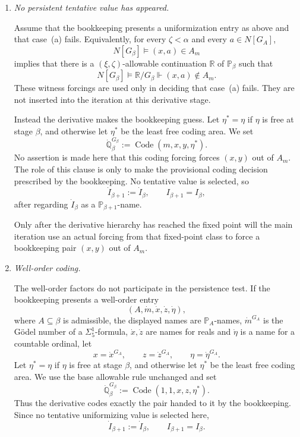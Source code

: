 \documentclass[a4paper,11pt]{article}
\newcommand{\forceP}{\mathbb{P}}
\newcommand{\forceQ}{\mathbb{Q}}
\newcommand{\forceR}{\mathbb{R}}
\begin{document}
\begin{enumerate}
\item[(b)] \emph{No persistent tentative value has appeared.}

Assume that the bookkeeping presents a uniformization entry as above and that case~(a) fails. Equivalently, for every $\zeta<\alpha$ and every $a\in N[G_A]$,
\[
N[G_\beta]\models (x,a)\in A_m
\]
implies that there is a $(\xi,\zeta)$-allowable continuation $\forceR$ of $\forceP_\beta$ such that
\[
N[G_\beta]\models
\forceR/G_\beta\Vdash (x,a)\notin A_m.
\]
These witness forcings are used only in deciding that case~(a) fails. They are not inserted into the iteration at this derivative stage.

Instead the derivative makes the bookkeeping guess. Let $\eta^*=\eta$ if $\eta$ is free at stage $\beta$, and otherwise let $\eta^*$ be the least free coding area. We set
\[
\dot{\forceQ}_\beta^{G_\beta}
:=\operatorname{Code}(m,x,y,\eta^*).
\]
No assertion is made here that this coding forcing forces $(x,y)$ out of $A_m$. The role of this clause is only to make the provisional coding decision prescribed by the bookkeeping. No tentative value is selected, so
\[
\dot I_{\beta+1}:=\dot I_\beta,
\qquad
I_{\beta+1}=I_\beta,
\]
after regarding $\dot I_\beta$ as a $\forceP_{\beta+1}$-name.

Only after the derivative hierarchy has reached the fixed point will the main iteration use an actual forcing from that fixed-point class to force a bookkeeping pair $(x,y)$ out of $A_m$.

\item[(c)] \emph{Well-order coding.}

The well-order factors do not participate in the persistence test. If the bookkeeping presents a well-order entry
\[
(A,\dot m,\dot x,\dot z,\dot\eta),
\]
where $A\subseteq\beta$ is admissible, the displayed names are $\forceP_A$-names, $\dot m^{G_A}$ is the G\"odel number of a $\Sigma^1_5$-formula, $\dot x,\dot z$ are names for reals and $\dot\eta$ is a name for a countable ordinal, let
\[
x=\dot x^{G_A},\qquad
z=\dot z^{G_A},\qquad
\eta=\dot\eta^{G_A}.
\]
Let $\eta^*=\eta$ if $\eta$ is free at stage $\beta$, and otherwise let $\eta^*$ be the least free coding area. We use the base allowable rule unchanged and set
\[
\dot{\forceQ}_\beta^{G_\beta}
:=\operatorname{Code}(1,1,x,z,\eta^*).
\]
Thus the derivative codes exactly the pair handed to it by the bookkeeping. Since no tentative uniformizing value is selected here,
\[
\dot I_{\beta+1}:=\dot I_\beta,
\qquad
I_{\beta+1}=I_\beta.
\]
\end{enumerate}
\end{document}
